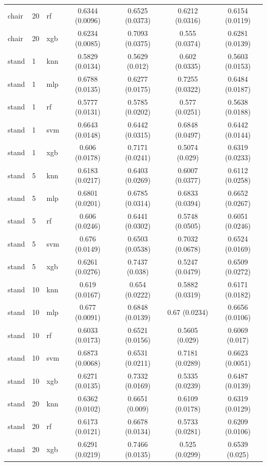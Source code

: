 \begin{table}
\begin{tabular}{lllcccc}
chair & 20 & rf & 0.6344 (0.0096) & 0.6525 (0.0373) & 0.6212 (0.0316) & 0.6154 (0.0119) \\
chair & 20 & xgb & 0.6234 (0.0085) & 0.7093 (0.0375) & 0.555 (0.0374) & 0.6281 (0.0139) \\
stand & 1 & knn & 0.5829 (0.0134) & 0.5629 (0.012) & 0.602 (0.0335) & 0.5603 (0.0153) \\
stand & 1 & mlp & 0.6788 (0.0135) & 0.6277 (0.0175) & 0.7255 (0.0322) & 0.6484 (0.0187) \\
stand & 1 & rf & 0.5777 (0.0131) & 0.5785 (0.0202) & 0.577 (0.0251) & 0.5638 (0.0188) \\
stand & 1 & svm & 0.6643 (0.0148) & 0.6442 (0.0315) & 0.6848 (0.0497) & 0.6442 (0.0144) \\
stand & 1 & xgb & 0.606 (0.0178) & 0.7171 (0.0241) & 0.5074 (0.029) & 0.6319 (0.0233) \\
stand & 5 & knn & 0.6183 (0.0217) & 0.6403 (0.0269) & 0.6007 (0.0377) & 0.6112 (0.0258) \\
stand & 5 & mlp & 0.6801 (0.0201) & 0.6785 (0.0314) & 0.6833 (0.0394) & 0.6652 (0.0267) \\
stand & 5 & rf & 0.606 (0.0246) & 0.6441 (0.0302) & 0.5748 (0.0505) & 0.6051 (0.0246) \\
stand & 5 & svm & 0.676 (0.0149) & 0.6503 (0.0538) & 0.7032 (0.0678) & 0.6524 (0.0169) \\
stand & 5 & xgb & 0.6261 (0.0276) & 0.7437 (0.038) & 0.5247 (0.0479) & 0.6509 (0.0272) \\
stand & 10 & knn & 0.619 (0.0167) & 0.654 (0.0222) & 0.5882 (0.0319) & 0.6171 (0.0182) \\
stand & 10 & mlp & 0.677 (0.0091) & 0.6848 (0.0139) & 0.67 (0.0234) & 0.6656 (0.0106) \\
stand & 10 & rf & 0.6033 (0.0173) & 0.6521 (0.0156) & 0.5605 (0.029) & 0.6069 (0.017) \\
stand & 10 & svm & 0.6873 (0.0068) & 0.6531 (0.0211) & 0.7181 (0.0289) & 0.6623 (0.0051) \\
stand & 10 & xgb & 0.6271 (0.0135) & 0.7332 (0.0169) & 0.5335 (0.0239) & 0.6487 (0.0139) \\
stand & 20 & knn & 0.6362 (0.0102) & 0.6651 (0.009) & 0.6109 (0.0178) & 0.6319 (0.0129) \\
stand & 20 & rf & 0.6173 (0.0121) & 0.6678 (0.0134) & 0.5733 (0.0281) & 0.6209 (0.0106) \\
stand & 20 & xgb & 0.6291 (0.0219) & 0.7466 (0.0135) & 0.525 (0.0299) & 0.6539 (0.025) \\
\bottomrule
\end{tabular}
\end{table}
